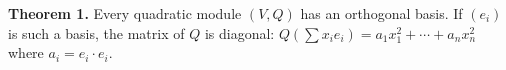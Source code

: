 \textbf{Theorem 1.} Every quadratic module $(V,Q)$ has an orthogonal basis. If $(e_i)$ is such a basis, the matrix of $Q$ is diagonal: $Q(\sum x_i e_i) = a_1 x_1^2 + \cdots + a_n x_n^2$ where $a_i = e_i \cdot e_i$.

